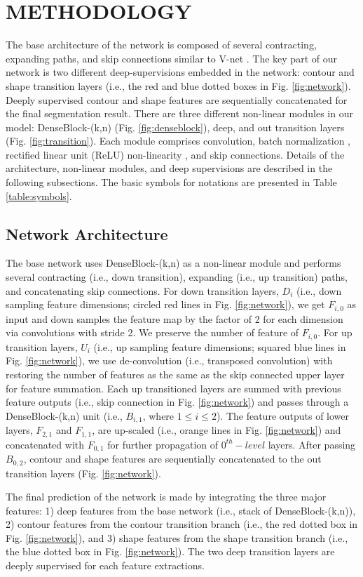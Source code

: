 \documentclass[journal]{IEEEtran}
\begin{document}
\section{METHODOLOGY}

The base architecture of the network is composed of several contracting, expanding paths, and skip connections similar to V-net \cite{milletari2016v}. The key part of our network is two different deep-supervisions embedded in the network: contour and shape transition layers (i.e., the red and blue dotted boxes in Fig. \ref{fig:network}). Deeply supervised contour and shape features are sequentially concatenated for the final segmentation result. There are three different non-linear modules in our model: DenseBlock-(k,n) (Fig. \ref{fig:denseblock}), deep, and out transition layers (Fig. \ref{fig:transition}). Each module comprises convolution, batch normalization \cite{ioffe2015batch}, rectified linear unit (ReLU) non-linearity \cite{nair2010rectified}, and skip connections. Details of the architecture, non-linear modules, and deep supervisions are described in the following subsections. The basic symbols for notations are presented in Table \ref{table:symbols}.



\subsection{Network Architecture}
The base network uses DenseBlock-(k,n) as a non-linear module and performs several contracting (i.e., down transition), expanding (i.e., up transition) paths, and concatenating skip connections. For down transition layers, \(D_i\) (i.e., down sampling feature dimensions; circled red lines in Fig. \ref{fig:network}), we get \(F_{i,0}\) as input and down samples the feature map by the factor of 2 for each dimension via convolutions with stride 2. We preserve the number of feature of \(F_{i,0}\). For up transition layers, \(U_i\) (i.e., up sampling feature dimensions; squared blue lines in Fig. \ref{fig:network}), we use de-convolution (i.e., transposed convolution) with restoring the number of features as the same as the skip connected upper layer for feature summation. Each up transitioned layers are summed with previous feature outputs (i.e., skip connection in Fig. \ref{fig:network}) and passes through a DenseBlock-(k,n) unit (i.e., \(B_{i,1}\), where \(1\leq i\leq2\)). The feature outputs of lower layers, \(F_{2,1}\) and \(F_{1,1}\), are up-scaled (i.e., orange lines in Fig. \ref{fig:network}) and concatenated with \(F_{0,1}\) for further propagation of \(0^{th}-level\) layers. After passing \(B_{0,2}\), contour and shape features are sequentially concatenated to the out transition layers (Fig. \ref{fig:network}).\par
The final prediction of the network is made by integrating the three major features: 1) deep features from the base network (i.e., stack of DenseBlock-(k,n)), 2) contour features from the contour transition branch (i.e., the red dotted box in Fig. \ref{fig:network}), and 3) shape features from the shape transition branch (i.e., the blue dotted box in Fig. \ref{fig:network}). The two deep transition layers are deeply supervised for each feature extractions.
\end{document}
